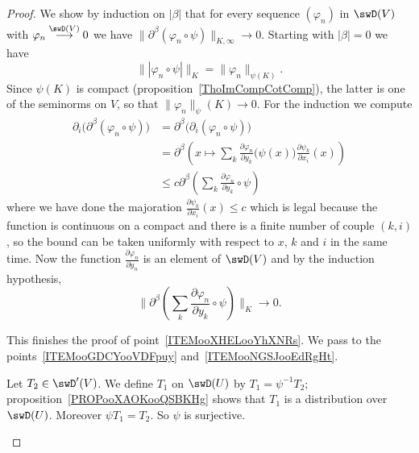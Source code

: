 \begin{proof}
    We show by induction on \( | \beta |\) that for every sequence \( ( \varphi_n)\) in \( \swD(V)\) with \( \varphi_n \stackrel{\swD(V)}{\longrightarrow}0\) we have \(  \| \partial^{\beta}(\varphi_n\circ\psi) \|_{K,\infty}\to 0\). Starting with \( | \beta |=0\) we have
    \begin{equation}
        \| | \varphi_n\circ\psi | \|_K=\| \varphi_n \|_{\psi(K)}.
    \end{equation}
    Since \( \psi(K)\) is compact (proposition~\ref{ThoImCompCotComp}), the latter is one of the seminorms on \( V\), so that \( \| \varphi_n \|_\psi(K)\to 0\). For the induction we compute
    \begin{subequations}
        \begin{align}
            \partial_i\big( \partial^{\beta}(\varphi_n\circ\psi) \big)&=\partial^{\beta}\big( \partial_i(\varphi_n\circ\psi) \big)\\
            &=\partial^{\beta}\left(  x\mapsto  \sum_k\frac{ \partial \varphi_n }{ \partial y_k }\big( \psi(x)\big)\frac{ \partial \psi_k }{ \partial x_i }(x) \right)\\
            &\leq c\partial^{\beta}\left( \sum_k\frac{ \partial \varphi_n }{ \partial y_k }\circ\psi \right)
        \end{align}
    \end{subequations}
    where we have done the majoration \( \frac{ \partial \psi_k }{ \partial x_i }(x)\leq c\) which is legal because the function is continuous on a compact and there is a finite number of couple \( (k,i)\), so the bound can be taken uniformly with respect to \( x\), \( k\) and \( i\) in the same time. Now the function \( \frac{ \partial \varphi_n }{ \partial y_n }\) is an element of \( \swD(V)\) and by the induction hypothesis,
    \begin{equation}
       \| \partial^{\beta}\left( \sum_k\frac{ \partial \varphi_n }{ \partial y_k }\circ\psi \right) \|_K\to 0.
    \end{equation}

    This finishes the proof of point~\ref{ITEMooXHELooYhXNRs}. We pass to the points~\ref{ITEMooGDCYooVDFpuy} and~\ref{ITEMooNGSJooEdRgHt}.
    \begin{subproof}

            Let \( T_2\in\swD'(V)\). We define \( T_1\) on \( \swD(U)\) by \( T_1=\psi^{-1} T_2\); proposition~\ref{PROPooXAOKooQSBKHg} shows that \( T_1\) is a distribution over \( \swD(U)\). Moreover \( \psi T_1=T_2\). So \( \psi\) is surjective.


\end{subproof}
\end{proof}
